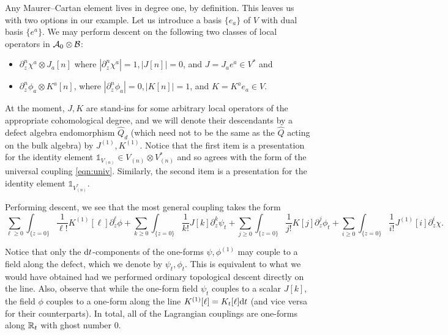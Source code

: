 \documentclass[11pt]{amsart}
\def\id{\mathbb{1}}
\begin{document}
Any Maurer--Cartan element lives in degree one, by definition. This leaves us with two options in our example. 
Let us introduce a basis $\{e_a\}$ of $V$ with dual basis $\{e^a\}$.
We may perform descent on the following two classes of local operators in $\mathcal A_0 \otimes \mathcal B$:
\begin{itemize}
\item $\partial_z^n \chi^a \otimes J_a[n]$ where $|\partial_z^n \chi^a| = 1, |J[n]|=0$, and $J = J_a e^a \in V^*$ and
\item $\partial_z^n \phi_a \otimes K^a[n]$, where $|\partial_z^n \phi_a|=0, |K[n]| = 1$, and $K = K^a e_a \in V$. 
\end{itemize}
At the moment, $J, K$ are stand-ins for some arbitrary local operators of the appropriate cohomological degree, and we will denote their descendants by a defect algebra endomorphism $\hat{Q}_{d}$ (which need not to be the same as the $\hat{Q}$ acting on the bulk algebra) by $J^{(1)}, K^{(1)}$. 
Notice that the first item is a presentation for the identity element $\id_{V_{(n)}} \in V_{(n)} \otimes V_{(n)}^*$ and so agrees with the form of the universal coupling \eqref{eqn:univ}. 
Similarly, the second item is a presentation for the identity element $\id_{V^*_{(n)}}$. 

Performing descent, we see that the most general coupling takes the form
\[
\sum_{\ell \geq 0} \int_{\{z=0\}} \frac{1}{\ell!} K^{(1)} [\ell] \partial_z^\ell \phi + \sum_{k \geq 0} \int_{\{z=0\}} \frac{1}{k!} J[k] \partial_z^k \psi_t  + \sum_{j \geq 0} \int_{\{z=0\}} \frac{1}{j!} K[j] \partial_z^j \phi_t +  \sum_{i \geq 0} \int_{\{z=0\}} \frac{1}{i!} J^{(1)}[i] \partial_z^i \chi.
\] 

Notice that only the ${\rm d} t$-components of the one-forms $\psi, \phi^{(1)}$ may couple to a field along the defect, which we denote by $\psi_t, \phi_t$. This is equivalent to what we would have obtained had we performed ordinary topological descent directly on the line.
Also, observe that while the one-form field $\psi_t$ couples to a scalar $J[k]$, the field $\phi$ couples to a one-form along the line $K^{(1)}[\ell] = K_t [\ell] {\rm d} t$ (and vice versa for their counterparts). 
In total, all of the Lagrangian couplings are one-forms along $\mathbb R_t$ with ghost number 0.
\end{document}

